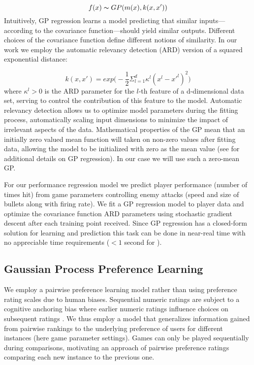 \documentclass[letterpaper]{article}
\begin{document}
$$ f(x) \thicksim GP( m(x), k(x,x') ) $$
Intuitively, GP regression learns a model predicting that similar inputs---according to the covariance function---should yield similar outputs. Different choices of the covariance function define different notions of similarity. In our work we employ the automatic relevancy detection (ARD) version of a squared exponential distance:

$$ k(x,x') = exp\big( -\frac{1}{2} \Sigma_{l=1}^{d} \kappa^{l} (x^{l} - x'^{l})^2 \big) $$
where $\kappa^{l} > 0$ is the ARD parameter for the $l$-th feature of a {d}-dimensional data set, serving to control the contribution of this feature to the model. Automatic relevancy detection allows us to optimize model parameters during the fitting process, automatically scaling input dimensions to minimize the impact of irrelevant aspects of the data. Mathematical properties of the GP mean that an initially zero valued mean function will taken on non-zero values after fitting data, allowing the model to be initialized with zero as the mean value (see \cite{rasmussen2006} for additional details on GP regression). In our case we will use such a zero-mean GP.

For our performance regression model we predict player performance (number of times hit) from game parameters controlling enemy attacks (speed and size of bullets along with firing rate). We fit a GP regression model to player data and optimize the covariance function ARD parameters using stochastic gradient descent after each training point received. Since GP regression has a closed-form solution for learning and prediction this task can be done in near-real time with no appreciable time requirements ($< 1$ second for ).

\subsection{Gaussian Process Preference Learning}
We employ a pairwise preference learning model rather than using preference rating scales due to human biases. Sequential numeric ratings are subject to a cognitive anchoring bias where earlier numeric ratings influence choices on subsequent ratings \cite{tversky1974:biases}. We thus employ a model that generalizes information gained from pairwise rankings to the underlying preference of users for different instances (here game parameter settings). Games can only be played sequentially during comparisons, motivating an approach of pairwise preference ratings comparing each new instance to the previous one.
\end{document}
